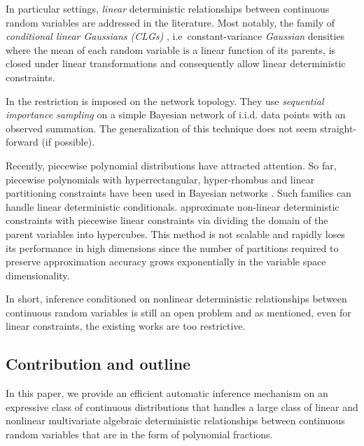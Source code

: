 \documentclass[]{article}
\begin{document}
In particular settings, \emph{linear} deterministic relationships between continuous random variables
are addressed in the literature.  
Most notably, 
the family of \emph{conditional linear Gaussians (CLGs)} \citep{lauritzen2001stable}, 
i.e\ constant-variance \emph{Gaussian} densities where the mean of each random variable is a linear function of its parents,
is closed under linear transformations and consequently
allow linear deterministic constraints.%

In \citep{li2013dynamic} the restriction is imposed on the network topology.
They use \emph{sequential importance sampling} on a simple Bayesian network of i.i.d. data points with an observed summation. %
The generalization of this technique does not seem straight-forward (if possible).

Recently, piecewise polynomial distributions have attracted attention.
So far, piecewise polynomials with hyperrectangular, hyper-rhombus and linear partitioning constraints have been used in Bayesian networks \citep{shenoy2011inference,shenoy2012two,Sanner:12}.
Such families can handle linear deterministic conditionals.
\cite{cobb2005nonlinear} approximate non-linear deterministic constraints with piecewise linear constraints via
dividing the domain of the parent variables into hypercubes. %
This method is not scalable and rapidly loses its performance in high dimensions since 
the number of partitions required to preserve approximation accuracy
grows exponentially in the variable space dimensionality. 

In short, inference conditioned on nonlinear deterministic relationships between continuous random variables is still an open problem \citep{li2013dynamic} and as mentioned, even for linear constraints, the existing works are too restrictive.
 
\subsection{Contribution and outline}
In this paper, we provide an efficient automatic inference mechanism 
on an expressive class of continuous distributions 
that handles a large class of linear and nonlinear multivariate algebraic deterministic relationships between continuous random variables that are in the form of polynomial fractions. 
\end{document}
